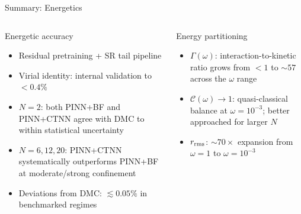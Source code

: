 \documentclass[aspectratio=169,10pt]{beamer}
\begin{document}
\begin{frame}{Summary: Energetics}
  \begin{columns}[T]
      \begin{block}{Energetic accuracy}
        \begin{itemize}
          \item Residual pretraining + SR tail pipeline
          \item Virial identity: internal validation to $<0.4\%$
          \item $N=2$: both PINN+BF and PINN+CTNN agree with DMC
                to within statistical uncertainty
          \item $N=6,12,20$: PINN+CTNN systematically outperforms
                PINN+BF at moderate/strong confinement
          \item Deviations from DMC: $\lesssim 0.05\%$ in benchmarked
                regimes
        \end{itemize}
      \end{block}
      \begin{block}{Energy partitioning}
        \begin{itemize}
          \item $\Gamma(\omega)$: interaction-to-kinetic ratio grows
                from $<1$ to $\sim 57$ across the $\omega$ range
          \item $\mathcal{C}(\omega)\to 1$: quasi-classical balance
                at $\omega=10^{-3}$; better approached for larger $N$
          \item $r_{\rm rms}$: $\sim\!70\times$ expansion from
                $\omega=1$ to $\omega=10^{-3}$
        \end{itemize}
      \end{block}
  \end{columns}
\end{frame}
\end{document}
